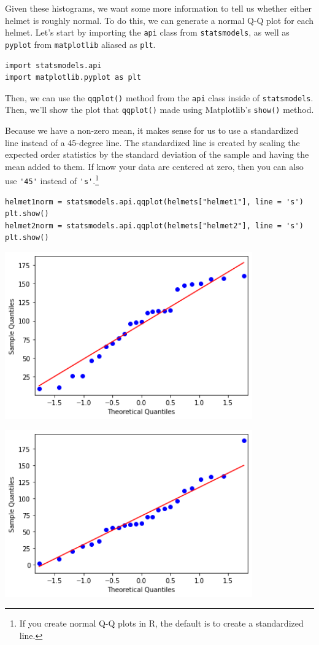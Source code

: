 Given these histograms, we want some more information to tell us whether either helmet is roughly normal. To do this, we can generate a normal Q-Q plot for each helmet. Let's start by importing the \verb|api| class from \verb|statsmodels|, as well as \verb|pyplot| from \verb|matplotlib| aliased as \verb|plt|.
\begin{lstlisting}[style=pippython]
import statsmodels.api
import matplotlib.pyplot as plt
\end{lstlisting}
Then, we can use the \verb|qqplot()| method from the \verb|api| class inside of \verb|statsmodels|. Then, we'll show the plot that \verb|qqplot()| made using Matplotlib's \verb|show()| method.\par
Because we have a non-zero mean, it makes sense for us to use a standardized line instead of a 45-degree line. The standardized line is created by scaling the expected order statistics by the standard deviation of the sample and having the mean added to them. If know your data are centered at zero, then you can also use \verb|'45'| instead of \verb|'s'|.\footnote{If you create normal Q-Q plots in R, the default is to create a standardized line.}
\begin{lstlisting}[style=pippython]
helmet1norm = statsmodels.api.qqplot(helmets["helmet1"], line = 's')
plt.show()
helmet2norm = statsmodels.api.qqplot(helmets["helmet2"], line = 's')
plt.show()
\end{lstlisting}

\includegraphics[width = 0.8\textwidth]{img/hist6.png}

\includegraphics[width = 0.8\textwidth]{img/hist7.png}

